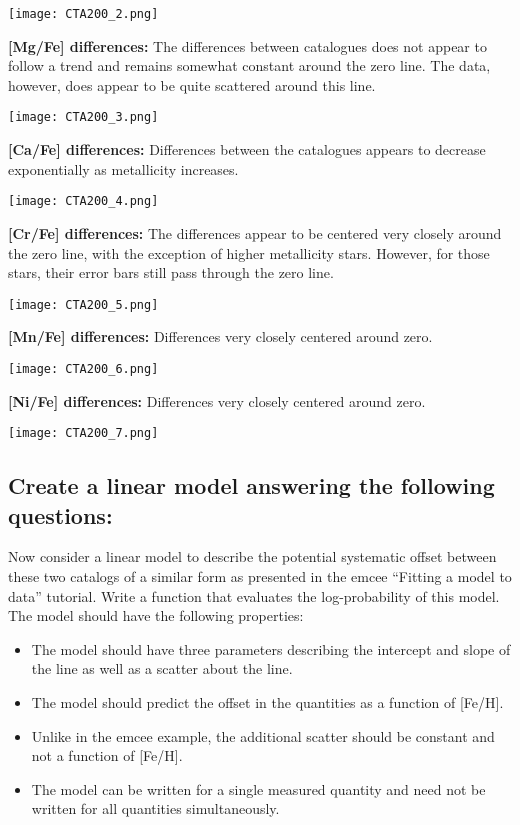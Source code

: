 \documentclass{article}
\begin{document}
\texttt{[image: CTA200\_2.png]}
\bigskip\noindent

\textbf{[Mg/Fe] differences:} The differences between catalogues does not appear to follow a trend and remains somewhat constant around the zero line. The data, however, does appear to be quite scattered around this line.

\texttt{[image: CTA200\_3.png]}
\bigskip\noindent

\textbf{[Ca/Fe] differences:} Differences between the catalogues appears to decrease exponentially as metallicity increases.

\texttt{[image: CTA200\_4.png]}
\bigskip\noindent

\textbf{[Cr/Fe] differences:} The differences appear to be centered very closely around the zero line, with the exception of higher metallicity stars. However, for those stars, their error bars still pass through the zero line.

\texttt{[image: CTA200\_5.png]}
\bigskip\noindent

\textbf{[Mn/Fe] differences:} Differences very closely centered around zero.

\texttt{[image: CTA200\_6.png]}
\bigskip\noindent

\textbf{[Ni/Fe] differences:} Differences very closely centered around zero.

\texttt{[image: CTA200\_7.png]}
\bigskip\noindent

\subsection{Create a linear model answering the following questions:}
Now consider a linear model to describe the potential systematic offset between these two catalogs of a similar form as presented in the emcee “Fitting a model to data” tutorial. Write a function that evaluates the log-probability of this model. The model should have the following properties:
\begin{itemize}
    \item The model should have three parameters describing the intercept and slope of the line as well as a scatter about the line.
    \item The model should predict the offset in the quantities as a function of [Fe/H]. 
    \item Unlike in the emcee example, the additional scatter should be constant and not a function of [Fe/H].
    \item The model can be written for a single measured quantity and need not be written for all quantities simultaneously.
\end{itemize}
\end{document}
